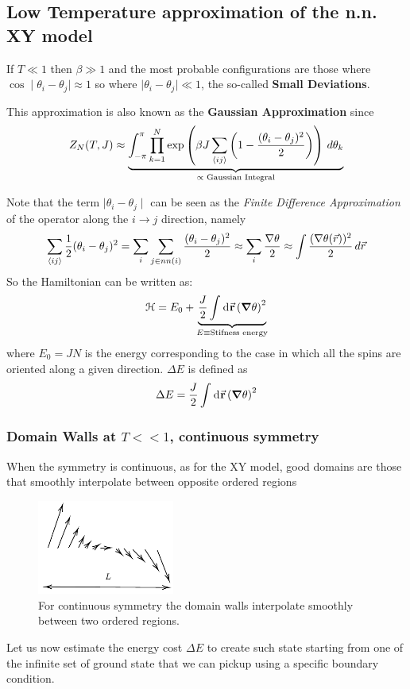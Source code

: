 \documentclass[../../Main/Main.tex]{subfiles}
\begin{document}
\subsection{Low Temperature approximation of the n.n. XY model}

If $T \ll 1$ then $\beta \gg 1$ and the most probable configurations are those where $\cos \mid \theta_{i} - \theta_{j}\mid \approx 1$ so where $\mid \theta_{i} - \theta_{j}\mid \ll 1$, the so-called \textbf{Small Deviations}.

This approximation is also known as the \textbf{Gaussian Approximation} since 
$$Z_{N}(T,J) \approx \underbrace{ \int _{-\pi}^{\pi} \prod_{k=1}^{N}\exp\left( \beta J \sum_{{\left< ij \right>} }\left( 1 - \frac{(\theta_{i} - \theta_{j})^{2}}{2} \right) \right) \, d\theta_{k} }_{ \propto \text{ Gaussian Integral} } $$

Note that the term $\mid \theta_{i} - \theta_{j}\mid$ can be seen as the \textit{Finite Difference Approximation} of the operator along the $i \to j$ direction, namely
$$\sum_{{\left< ij \right>} } \frac{1}{2}(\theta_{i} - \theta_{j})^{2} = \sum_{i} \sum_{j \in nn(i)} \frac{(\theta_{i} - \theta_{j})^{2}}{2} \approx \sum_{i} \frac{\nabla \theta}{2} \approx \int \frac{(\nabla \theta(\vec{r}))^{2}}{2} \, d\vec{r} $$
So the Hamiltonian can be written as:
\begin{equation}
  \mathcal{H} = E_0 + \underbrace{\frac{J}{2} \int_{}^{} \dd[]{\va{r}} \qty(\grad \theta )^2 }_{E \equiv \text{Stifness energy}}
\end{equation}
where \( E_0 = JN \) is the energy corresponding to the case in which all the spins are oriented along a given direction. $\Delta E$ is defined as
  \begin{equation}
    \Delta E = \frac{J}{2} \int_{}^{} \dd[]{\va{r}} \qty(\grad \theta )^2
  \end{equation}

\subsubsection{Domain Walls at $T << 1$, continuous symmetry}

When the symmetry is continuous, as for the XY model, good domains are those that smoothly interpolate between opposite ordered regions
\begin{figure}[H]
\centering
\includegraphics[width=0.4\textwidth]{./img/3.pdf}
\caption{\label{fig:10_3} For continuous symmetry the domain walls interpolate smoothly between two ordered regions.}
\end{figure}
Let us now estimate the energy cost $\Delta E$ to create such state starting from one of the infinite set of ground state that we can pickup using a specific boundary condition.
\end{document}
